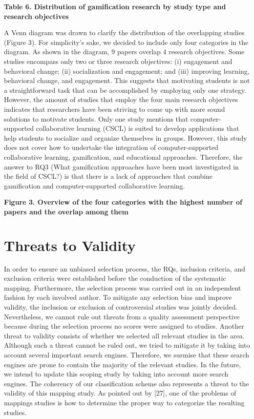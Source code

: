 \textbf{Table 6. Distribution of gamification research by study type and research objectives}

A Venn diagram was drawn to clarify the distribution of the
overlapping studies (Figure 3). For simplicity’s sake, we decided to
include only four categories in the diagram. As shown in the
diagram, 9 papers overlap 4 research objectives. Some studies
encompass only two or three research objectives: (i) engagement
and behavioral change; (ii) socialization and engagement; and (iii)
improving learning, behavioral change, and engagement. This
suggests that motivating students is not a straightforward task that
can be accomplished by employing only one strategy. However, the
amount of studies that employ the four main research objectives
indicates that researchers have been striving to come up with more
sound solutions to motivate students.
Only one study mentions that computer-supported collaborative
learning (CSCL) is suited to develop applications that help students
to socialize and organize themselves in groups. However, this study
does not cover how to undertake the integration of computer-supported
collaborative learning, gamification, and educational
approaches. Therefore, the answer to RQ3 (What gamification
approaches have been most investigated in the field of CSCL?) is
that there is a lack of approaches that combine gamification and
computer-supported collaborative learning. 

\textbf{Figure 3. Overview of the four categories with the highest
number of papers and the overlap among them }

\section{Threats to Validity}

In order to ensure an unbiased selection process, the RQs, inclusion
criteria, and exclusion criteria were established before the
conduction of the systematic mapping. Furthermore, the selection
process was carried out in an independent fashion by each involved
author. To mitigate any selection bias and improve validity, the
inclusion or exclusion of controversial studies was jointly decided.
Nevertheless, we cannot rule out threats from a quality assessment
perspective because during the selection process no scores were
assigned to studies.
Another threat to validity consists of whether we selected all
relevant studies in the area. Although such a threat cannot be ruled
out, we tried to mitigate it by taking into account several important
search engines. Therefore, we surmise that these search engines are
prone to contain the majority of the relevant studies. In the future,
we intend to update this scoping study by taking into account more
search engines. The coherency of our classification scheme also
represents a threat to the validity of this mapping study. As pointed
out by [27], one of the problems of mappings studies is how to
determine the proper way to categorize the resulting studies. 

